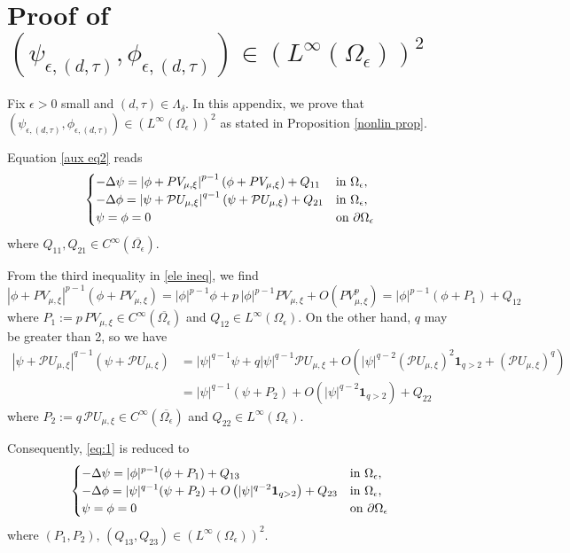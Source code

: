\documentclass[reqno]{amsart}
\theoremstyle{remark}
\newcommand{\pa}{\partial}
\newcommand{\ep}{\epsilon}
\newcommand{\mone}{\mathbf{1}}
\newcommand{\mcp}{\mathcal{P}}
\newcommand{\mx}{{\mu,\xi}}
\renewcommand{\(}{\left(}
\renewcommand{\)}{\right)}
\numberwithin{equation}{section}
\begin{document}
\section{Proof of $(\psi_{\ep,(d,\tau)},\phi_{\ep,(d,\tau)}) \in (L^{\infty}(\Omega_\ep))^2$}\label{sec bdd}
Fix $\ep > 0$ small and $(d,\tau) \in \Lambda_\delta$. In this appendix, we prove that $(\psi_{\ep,(d,\tau)},\phi_{\ep,(d,\tau)}) \in (L^{\infty}(\Omega_\ep))^2$ as stated in Proposition \ref{nonlin prop}.

\medskip
Equation \eqref{aux eq2} reads
\begin{equation}\label{eq:1}
\begin{cases}
\displaystyle -\Delta \psi = \left|\phi + PV_\mx\right|^{p-1} \(\phi + PV_\mx\) + Q_{11} &\textup{in } \Omega_\ep,\\
\displaystyle -\Delta \phi = \left|\psi + \mcp U_\mx\right|^{q-1} \(\psi + \mcp U_\mx\) + Q_{21} &\textup{in } \Omega_\ep,\\
\psi = \phi = 0 &\textup{on } \pa \Omega_\ep
\end{cases}
\end{equation}
where $Q_{11}, Q_{21} \in C^{\infty}(\overline{\Omega_\ep})$.

From the third inequality in \eqref{ele ineq}, we find
\[\left|\phi + PV_\mx\right|^{p-1} \(\phi + PV_\mx\) = |\phi|^{p-1} \phi + p\, |\phi|^{p-1} PV_\mx + O\(PV_\mx^p\) = |\phi|^{p-1} \(\phi +P_1\) + Q_{12}\]
where $P_1 := p\, PV_\mx \in C^{\infty}(\overline{\Omega_\ep})$ and $Q_{12} \in L^{\infty}(\Omega_\ep)$. On the other hand, $q$ may be greater than 2, so we have
\begin{align*}
\left|\psi + \mcp U_\mx\right|^{q-1} \(\psi + \mcp U_\mx\)
&= |\psi|^{q-1} \psi + q |\psi|^{q-1} \mcp U_\mx + O\(|\psi|^{q-2}(\mcp U_\mx)^2 \mone_{q>2} + (\mcp U_\mx)^q\) \\
&= |\psi|^{q-1} (\psi + P_2) + O\(|\psi|^{q-2} \mone_{q>2}\) + Q_{22}
\end{align*}
where $P_2 := q\, \mcp U_\mx \in C^{\infty}(\overline{\Omega_\ep})$ and $Q_{22} \in L^{\infty}(\Omega_\ep)$.

Consequently, \eqref{eq:1} is reduced to
\begin{equation}\label{eq:2}
\begin{cases}
\displaystyle -\Delta \psi = |\phi|^{p-1} (\phi + P_1) + Q_{13} &\textup{in } \Omega_\ep,\\
\displaystyle -\Delta \phi = |\psi|^{q-1} (\psi + P_2) + O\(|\psi|^{q-2} \mone_{q>2}\) + Q_{23} &\textup{in } \Omega_\ep,\\
\psi = \phi = 0 &\textup{on } \pa \Omega_\ep
\end{cases}
\end{equation}
where $(P_1, P_2),\, (Q_{13},Q_{23}) \in (L^{\infty}(\Omega_\ep))^2$.
\end{document}
